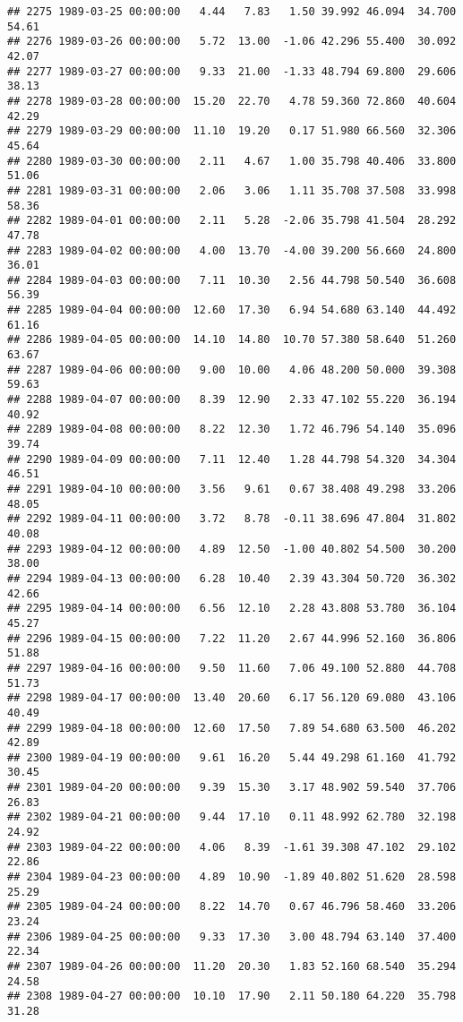 \documentclass{article}\usepackage{graphicx, color}
\makeatletter
\newenvironment{kframe}{%
 \def\at@end@of@kframe{}%
 \ifinner\ifhmode%
  \def\at@end@of@kframe{\end{minipage}}%
  \begin{minipage}{\columnwidth}%
 \fi\fi%
 \def\FrameCommand##1{\hskip\@totalleftmargin \hskip-\fboxsep
 \colorbox{shadecolor}{##1}\hskip-\fboxsep
     \hskip-\linewidth \hskip-\@totalleftmargin \hskip\columnwidth}%
 \MakeFramed {\advance\hsize-\width
   \@totalleftmargin\z@ \linewidth\hsize
   \@setminipage}}%
 {\par\unskip\endMakeFramed%
 \at@end@of@kframe}
\newenvironment{knitrout}{}{} %
\makeatother
\begin{document}
\begin{knitrout}
\begin{kframe}
\begin{verbatim}
## 2275 1989-03-25 00:00:00   4.44   7.83   1.50 39.992 46.094  34.700  54.61
## 2276 1989-03-26 00:00:00   5.72  13.00  -1.06 42.296 55.400  30.092  42.07
## 2277 1989-03-27 00:00:00   9.33  21.00  -1.33 48.794 69.800  29.606  38.13
## 2278 1989-03-28 00:00:00  15.20  22.70   4.78 59.360 72.860  40.604  42.29
## 2279 1989-03-29 00:00:00  11.10  19.20   0.17 51.980 66.560  32.306  45.64
## 2280 1989-03-30 00:00:00   2.11   4.67   1.00 35.798 40.406  33.800  51.06
## 2281 1989-03-31 00:00:00   2.06   3.06   1.11 35.708 37.508  33.998  58.36
## 2282 1989-04-01 00:00:00   2.11   5.28  -2.06 35.798 41.504  28.292  47.78
## 2283 1989-04-02 00:00:00   4.00  13.70  -4.00 39.200 56.660  24.800  36.01
## 2284 1989-04-03 00:00:00   7.11  10.30   2.56 44.798 50.540  36.608  56.39
## 2285 1989-04-04 00:00:00  12.60  17.30   6.94 54.680 63.140  44.492  61.16
## 2286 1989-04-05 00:00:00  14.10  14.80  10.70 57.380 58.640  51.260  63.67
## 2287 1989-04-06 00:00:00   9.00  10.00   4.06 48.200 50.000  39.308  59.63
## 2288 1989-04-07 00:00:00   8.39  12.90   2.33 47.102 55.220  36.194  40.92
## 2289 1989-04-08 00:00:00   8.22  12.30   1.72 46.796 54.140  35.096  39.74
## 2290 1989-04-09 00:00:00   7.11  12.40   1.28 44.798 54.320  34.304  46.51
## 2291 1989-04-10 00:00:00   3.56   9.61   0.67 38.408 49.298  33.206  48.05
## 2292 1989-04-11 00:00:00   3.72   8.78  -0.11 38.696 47.804  31.802  40.08
## 2293 1989-04-12 00:00:00   4.89  12.50  -1.00 40.802 54.500  30.200  38.00
## 2294 1989-04-13 00:00:00   6.28  10.40   2.39 43.304 50.720  36.302  42.66
## 2295 1989-04-14 00:00:00   6.56  12.10   2.28 43.808 53.780  36.104  45.27
## 2296 1989-04-15 00:00:00   7.22  11.20   2.67 44.996 52.160  36.806  51.88
## 2297 1989-04-16 00:00:00   9.50  11.60   7.06 49.100 52.880  44.708  51.73
## 2298 1989-04-17 00:00:00  13.40  20.60   6.17 56.120 69.080  43.106  40.49
## 2299 1989-04-18 00:00:00  12.60  17.50   7.89 54.680 63.500  46.202  42.89
## 2300 1989-04-19 00:00:00   9.61  16.20   5.44 49.298 61.160  41.792  30.45
## 2301 1989-04-20 00:00:00   9.39  15.30   3.17 48.902 59.540  37.706  26.83
## 2302 1989-04-21 00:00:00   9.44  17.10   0.11 48.992 62.780  32.198  24.92
## 2303 1989-04-22 00:00:00   4.06   8.39  -1.61 39.308 47.102  29.102  22.86
## 2304 1989-04-23 00:00:00   4.89  10.90  -1.89 40.802 51.620  28.598  25.29
## 2305 1989-04-24 00:00:00   8.22  14.70   0.67 46.796 58.460  33.206  23.24
## 2306 1989-04-25 00:00:00   9.33  17.30   3.00 48.794 63.140  37.400  22.34
## 2307 1989-04-26 00:00:00  11.20  20.30   1.83 52.160 68.540  35.294  24.58
## 2308 1989-04-27 00:00:00  10.10  17.90   2.11 50.180 64.220  35.798  31.28

\end{verbatim}
\end{kframe}
\end{knitrout}
\end{document}
